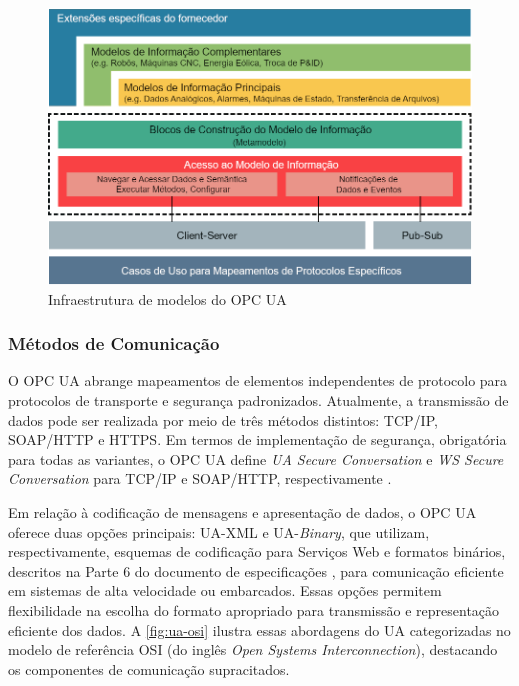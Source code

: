         \begin{figure}[htbp]
            \caption{Infraestrutura de modelos do OPC UA}
            \label{fig:opcuaArq}
            \begin{center}
                \includegraphics[width=0.9\linewidth]{USPSC-img/opcuaArq.png}
            \end{center}
        \end{figure}

    \subsubsection{Métodos de Comunicação}

        O OPC UA abrange mapeamentos de elementos independentes de protocolo para protocolos de transporte e segurança padronizados. Atualmente, a transmissão de dados pode ser realizada por meio de três métodos distintos: TCP/IP, SOAP/HTTP e HTTPS. Em termos de implementação de segurança, obrigatória para todas as variantes, o OPC UA define \textit{UA Secure Conversation} e \textit{WS Secure Conversation} para TCP/IP e SOAP/HTTP, respectivamente \cite{neumann2015}.

        Em relação à codificação de mensagens e apresentação de dados, o OPC UA oferece duas opções principais: UA-XML e UA-\textit{Binary}, que utilizam, respectivamente, esquemas de codificação para Serviços Web e formatos binários, descritos na Parte 6 do documento de especificações \cite{opc2022}, para comunicação eficiente em sistemas de alta velocidade ou embarcados. Essas opções permitem flexibilidade na escolha do formato apropriado para transmissão e representação eficiente dos dados. A \autoref{fig:ua-osi} ilustra essas abordagens do UA categorizadas no modelo de referência OSI (do inglês \textit{Open Systems Interconnection}), destacando os componentes de comunicação supracitados. %
        
